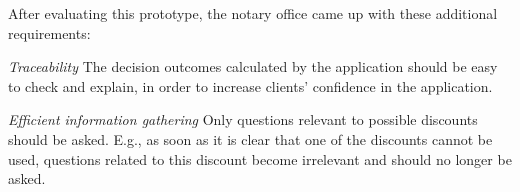 After evaluating this prototype, the notary office came up with these additional requirements:
\begin{compactitem}
\item \emph{Traceability}  The decision outcomes calculated by the application should be easy to check and explain,  in order to increase clients' confidence in the application.  
\item \emph{Efficient information gathering}  Only questions relevant to possible discounts should be asked. E.g., as soon as it is clear that one of the discounts cannot be used, questions related to this discount become irrelevant and should no longer be asked.
\end{compactitem}